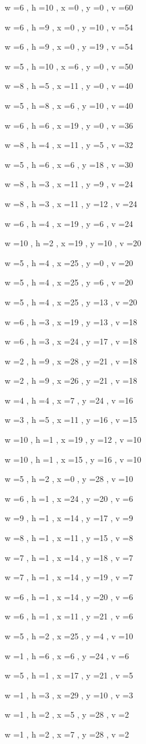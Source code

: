 \documentclass[11pt]{article}
\begin{document}
w =6 , h =10 , x =0 , y =0 , v =60
\par
w =6 , h =9 , x =0 , y =10 , v =54
\par
w =6 , h =9 , x =0 , y =19 , v =54
\par
w =5 , h =10 , x =6 , y =0 , v =50
\par
w =8 , h =5 , x =11 , y =0 , v =40
\par
w =5 , h =8 , x =6 , y =10 , v =40
\par
w =6 , h =6 , x =19 , y =0 , v =36
\par
w =8 , h =4 , x =11 , y =5 , v =32
\par
w =5 , h =6 , x =6 , y =18 , v =30
\par
w =8 , h =3 , x =11 , y =9 , v =24
\par
w =8 , h =3 , x =11 , y =12 , v =24
\par
w =6 , h =4 , x =19 , y =6 , v =24
\par
w =10 , h =2 , x =19 , y =10 , v =20
\par
w =5 , h =4 , x =25 , y =0 , v =20
\par
w =5 , h =4 , x =25 , y =6 , v =20
\par
w =5 , h =4 , x =25 , y =13 , v =20
\par
w =6 , h =3 , x =19 , y =13 , v =18
\par
w =6 , h =3 , x =24 , y =17 , v =18
\par
w =2 , h =9 , x =28 , y =21 , v =18
\par
w =2 , h =9 , x =26 , y =21 , v =18
\par
w =4 , h =4 , x =7 , y =24 , v =16
\par
w =3 , h =5 , x =11 , y =16 , v =15
\par
w =10 , h =1 , x =19 , y =12 , v =10
\par
w =10 , h =1 , x =15 , y =16 , v =10
\par
w =5 , h =2 , x =0 , y =28 , v =10
\par
w =6 , h =1 , x =24 , y =20 , v =6
\par
w =9 , h =1 , x =14 , y =17 , v =9
\par
w =8 , h =1 , x =11 , y =15 , v =8
\par
w =7 , h =1 , x =14 , y =18 , v =7
\par
w =7 , h =1 , x =14 , y =19 , v =7
\par
w =6 , h =1 , x =14 , y =20 , v =6
\par
w =6 , h =1 , x =11 , y =21 , v =6
\par
w =5 , h =2 , x =25 , y =4 , v =10
\par
w =1 , h =6 , x =6 , y =24 , v =6
\par
w =5 , h =1 , x =17 , y =21 , v =5
\par
w =1 , h =3 , x =29 , y =10 , v =3
\par
w =1 , h =2 , x =5 , y =28 , v =2
\par
w =1 , h =2 , x =7 , y =28 , v =2
\par
\newpage
\end{document}
